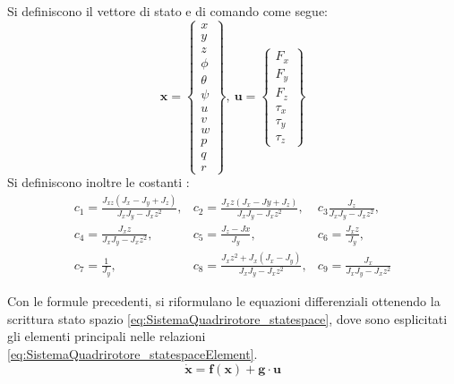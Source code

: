 Si definiscono il vettore di stato e di comando come segue:
\[ 
	\mathbf{x} = \begin{Bmatrix}
		x \\ y \\ z \\ \phi \\ \theta \\ \psi \\ u \\ v \\ w \\ p \\ q \\ r
	\end{Bmatrix}, \  \mathbf{u} = \begin{Bmatrix}
	F_x \\ F_y \\ F_z \\ \tau_x \\ \tau_y \\ \tau_z
	\end{Bmatrix}
\]
Si definiscono inoltre le costanti : 
\[ 
	\begin{matrix}
	c_1 = \frac{J_{xz} (J_x -J_y + J_z)}{J_x J_y- J_xz^2} , & c_2 = \frac{J_xz (J_x -Jy +J_z)}{J_x J_y-J_xz^2}, &c_3 \frac{J_z}{J_x J_y - J_xz^2}, \\
	c_4 = \frac{J_xz}{J_x J_y -J_xz^2} ,& c_5 = \frac{J_z - J x}{J_y},& c_6 = \frac{J_xz}{J_y}, \\
	c_7 = \frac{1}{J_y} ,& c_8 = \frac{J_xz^2 + J_x (J_x - J_y)}{J_x J_y - J_xz^2},& c_9 =  \frac{J_x}{J_x J_y -J_xz^2}
	\end{matrix}
\]

Con le formule precedenti, si riformulano le equazioni differenziali ottenendo la scrittura stato spazio \ref{eq:SistemaQuadrirotore_statespace}, dove sono esplicitati gli elementi principali nelle relazioni \ref{eq:SistemaQuadrirotore_statespaceElement}.
\begin{equation}\label{eq:SistemaQuadrirotore_statespace}
\mathbf{\dot{x}} = \mathbf{f(x)} + \mathbf{g} \cdot \mathbf{u}
\end{equation}

